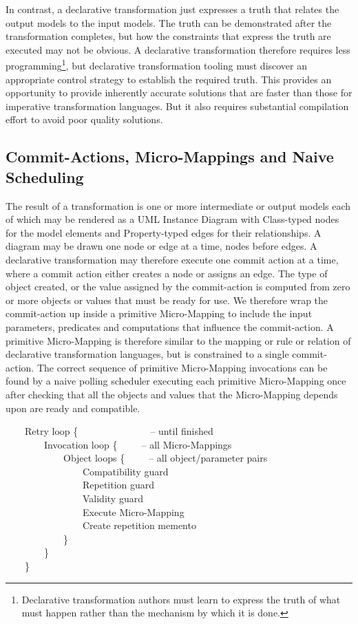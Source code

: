 \documentclass[conference]{IEEEtran}
\begin{document}
In contrast, a declarative transformation just expresses a truth that relates the output models to the input models. The truth can be demonstrated after the transformation completes, but how the constraints that express the truth are executed may not be obvious. A declarative transformation therefore requires less programming\footnote{Declarative transformation authors must learn to express the truth of what must happen rather than the mechanism by which it is done.}, but declarative transformation tooling must discover an appropriate control strategy to establish the required truth. This provides an opportunity to provide inherently accurate solutions that are faster than those for imperative transformation languages. But it also requires substantial compilation effort to avoid poor quality solutions.

\subsection{Commit-Actions, Micro-Mappings and Naive Scheduling}

The result of a transformation is one or more intermediate or output models each of which may be rendered as a UML Instance Diagram with Class-typed nodes for the model elements and Property-typed edges for their relationships. A diagram may be drawn one node or edge at a time, nodes before edges. A declarative transformation may therefore execute one commit action at a time, where a commit action either creates a node or assigns an edge. The type of object created, or the value assigned by the commit-action is computed from zero or more objects or values that must be ready for use. We therefore wrap the commit-action up inside a primitive Micro-Mapping to include the input parameters, predicates and computations that influence the commit-action. A primitive Micro-Mapping is therefore similar to the mapping or rule or relation of declarative transformation languages, but is constrained to a single commit-action. The correct sequence of primitive Micro-Mapping invocations can be found by a naive polling scheduler executing each primitive Micro-Mapping  once after checking that all the objects and values that the Micro-Mapping depends upon are ready and compatible.

\begin{flushleft}
~~~~Retry loop \{~~~~~~~~~~~~~~~-- until finished\\
~~~~~~~~Invocation loop \{~~~~~-- all Micro-Mappings\\
~~~~~~~~~~~~Object loops \{~~~~~-- all object/parameter pairs\\
~~~~~~~~~~~~~~~~Compatibility guard\\
~~~~~~~~~~~~~~~~Repetition guard\\
~~~~~~~~~~~~~~~~Validity guard\\
~~~~~~~~~~~~~~~~Execute Micro-Mapping\\
~~~~~~~~~~~~~~~~Create repetition memento\\
~~~~~~~~~~~~\}\\
~~~~~~~~\}\\
~~~~\}\\
\end{flushleft}
\end{document}
